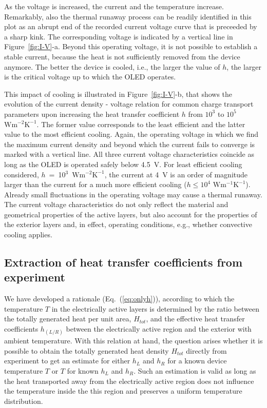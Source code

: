 \documentclass[%
9pt,
 aip,
rsi,%
 amsmath,amssymb,
preprint,%
]{revtex4-1}
\newcommand{\thermalconductivity}{$\mathrm{W m^{-1} K^{-1}}$}
\newcommand{\hcoefficient}{$\mathrm{W m^{-2} K^{-1}}$}
\begin{document}
%
As the voltage is increased, the current and the temperature increase. 
Remarkably, also the thermal runaway process can be readily identified in this plot as an abrupt end of the recorded current voltage curve that is preceeded by a sharp kink. The corresponding voltage is indicated by a vertical line in Figure~\ref{fig:I-V}-a.
Beyond this operating voltage, it is not possible to establish a stable current, because the heat is not sufficiently removed from the device anymore. The better the device is cooled, i.e., the larger the value of $h$, the larger is the critical voltage up to which the OLED operates. 

This impact of cooling is illustrated in Figure~\ref{fig:I-V}-b, that shows the evolution of the current density - voltage relation for common charge transport parameters upon increasing the heat transfer coefficient $h$ from $10^3$ to $10^5$ \hcoefficient. 
The former value corresponds to the least efficient and the latter value to the most efficient cooling.
Again, the operating voltage in which we find the maximum current density and beyond which the current fails to converge is marked with a vertical line. 
All three current voltage characteristics coincide as long as the OLED is operated safely below 4.5~V.
%
For least efficient cooling considered, $h$~=~10$^3$~\hcoefficient, the current at 4~V is an order of magnitude larger than the current for a much more efficient cooling ($h \leq 10^4$ \thermalconductivity). Already small fluctuations in the operating voltage may cause a thermal runaway.
The current voltage characteristics do not only reflect the material and geometrical properties of the active layers, but also account for the properties of the exterior layers and, in effect, operating conditions, e.g., whether convective cooling applies.


\subsection{Extraction of heat transfer coefficients from experiment}

We have developed a rationale (Eq.~(\ref{eq:onlyh})), according to which the temperature $T$ in the electrically active layers is determined by the ratio between the totally generated heat per unit area, $H_{tot}$, and the effective heat transfer coefficients $h_{(L/R)}$ between the electrically active region and the exterior with ambient temperature. 
With this relation at hand, the question arises whether it is possible to obtain the totally generated heat density $H_{tot}$ directly from experiment to get an estimate for either $h_L$ and $h_R$ for a known device temperature $T$ or $T$ for known $h_L$ and $h_R$.
Such an estimation is valid as long as the heat transported away from the electrically active region does not influence the temperature inside the this region and preserves a uniform temperature distribution. 
\end{document}
